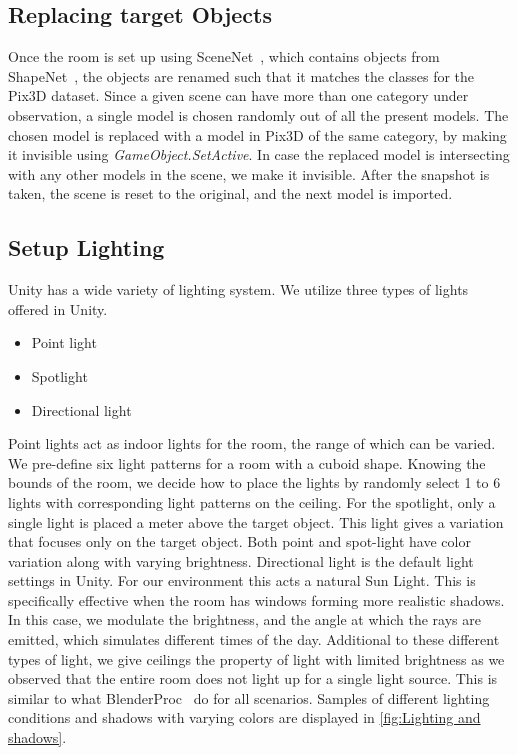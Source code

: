 \subsection{Replacing target Objects}\label{subsec:implementation_replacing-target-objects}
Once the room is set up using SceneNet~\cite{McCormac2017}, which contains objects from ShapeNet~\cite{shapenet2015}, the objects are renamed such that it matches the classes for the Pix3D dataset.
Since a given scene can have more than one category under observation, a single model is chosen randomly out of all the present models.
The chosen model is replaced with a model in Pix3D of the same category, by making it invisible using \emph{GameObject.SetActive}.
In case the replaced model is intersecting with any other models in the scene, we make it invisible.
After the snapshot is taken, the scene is reset to the original, and the next model is imported.


\subsection{Setup Lighting}\label{subsec:implementation_lighting}

Unity has a wide variety of lighting system.
We utilize three types of lights offered in Unity.

\begin{itemize}
    \item Point light
    \item Spotlight
    \item Directional light
\end{itemize}

Point lights act as indoor lights for the room, the range of which can be varied.
We pre-define six light patterns for a room with a cuboid shape.
Knowing the bounds of the room, we decide how to place the lights by randomly select 1 to 6 lights with corresponding light patterns on the ceiling.
For the spotlight, only a single light is placed a meter above the target object.
This light gives a variation that focuses only on the target object.
Both point and spot-light have color variation along with varying brightness.
Directional light is the default light settings in Unity.
For our environment this acts a natural Sun Light.
This is specifically effective when the room has windows forming more realistic shadows.
In this case, we modulate the brightness, and the angle at which the rays are emitted, which simulates different times of the day.
Additional to these different types of light, we give ceilings the property of light with limited brightness as we observed that the entire room does not light up for a single light source.
This is similar to what BlenderProc~\cite{dlr139317} do for all scenarios.
Samples of different lighting conditions and shadows with varying colors are displayed in \autoref{fig:Lighting and shadows}.


